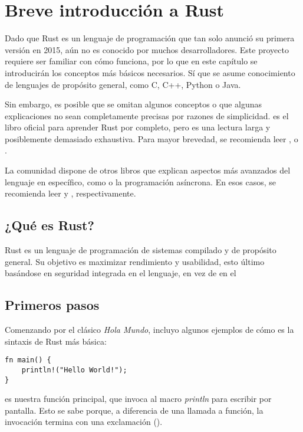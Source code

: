 
\chapter{Breve introducción a Rust}\label{ch:rust}

Dado que Rust es un lenguaje de programación que tan solo anunció su primera
versión en 2015, aún no es conocido por muchos desarrolladores. Este proyecto
requiere ser familiar con cómo funciona, por lo que en este capítulo se
introducirán los conceptos más básicos necesarios. Sí que se asume conocimiento
de lenguajes de propósito general, como C, C++, Python o Java.

Sin embargo, es posible que se omitan algunos conceptos o que algunas
explicaciones no sean completamente precisas por razones de simplicidad.
\textcite{rustfullbook} es el libro oficial para aprender Rust por completo,
pero es una lectura larga y posiblemente demasiado exhaustiva. Para mayor
brevedad, se recomienda leer \textcite{rustprofessionals},
\textcite{rustgentleintro} o \textcite{rust30min}.

La comunidad dispone de otros libros que explican aspectos más avanzados del
lenguaje en específico, como \unsafe o la programación asíncrona. En esos casos,
se recomienda leer \textcite{rustnomicon} y \textcite{rustasyncbook},
respectivamente.

\section{¿Qué es Rust?}

Rust es un lenguaje de programación de sistemas compilado y de propósito
general. Su objetivo es maximizar rendimiento y usabilidad, esto último
basándose en seguridad integrada en el lenguaje, en vez de en el \

\section{Primeros pasos}

Comenzando por el clásico \emph{Hola Mundo}, incluyo algunos ejemplos de cómo es
la sintaxis de Rust más básica:

\begin{verbatim}
fn main() {
    println!("Hello World!");
}
\end{verbatim}

 es nuestra función principal, que invoca al macro \emph{println}
para escribir por pantalla. Esto se sabe porque, a diferencia de una llamada a
función, la invocación termina con una exclamación (\code{!}).

